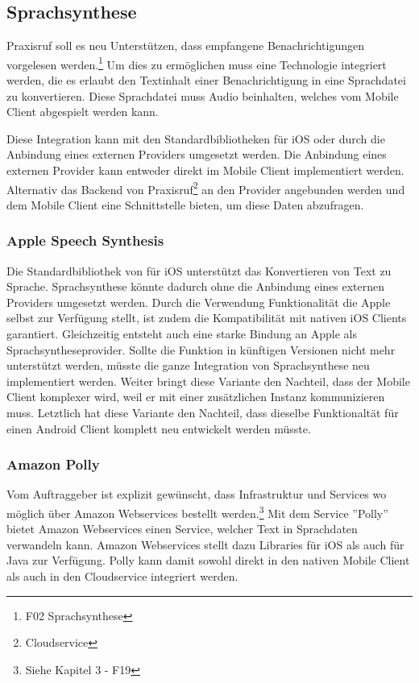 \subsection{Sprachsynthese}

Praxisruf soll es neu Unterstützen, dass empfangene Benachrichtigungen vorgelesen werden.\footnote{F02 Sprachsynthese}
Um dies zu ermöglichen muss eine Technologie integriert werden, die es erlaubt den Textinhalt einer Benachrichtigung in eine Sprachdatei zu konvertieren.
Diese Sprachdatei muss Audio beinhalten, welches vom Mobile Client abgespielt werden kann.

Diese Integration kann mit den Standardbibliotheken für iOS oder durch die Anbindung eines externen Providers umgesetzt werden.
Die Anbindung eines externen Provider kann entweder direkt im Mobile Client implementiert werden.
Alternativ das Backend von Praxisruf\footnote{Cloudservice} an den Provider angebunden werden und dem Mobile Client eine Schnittstelle bieten, um diese Daten abzufragen.

\subsubsection{Apple Speech Synthesis}

Die Standardbibliothek von für iOS unterstützt das Konvertieren von Text zu Sprache.\cite{ios_speech_synthesis}
Sprachsynthese könnte dadurch ohne die Anbindung eines externen Providers umgesetzt werden.
Durch die Verwendung Funktionalität die Apple selbst zur Verfügung stellt, ist zudem die Kompatibilität mit nativen iOS Clients garantiert.
Gleichzeitig entsteht auch eine starke Bindung an Apple als Sprachsyntheseprovider.
Sollte die Funktion in künftigen Versionen nicht mehr unterstützt werden, müsste die ganze Integration von Sprachsynthese neu implementiert werden.
Weiter bringt diese Variante den Nachteil, dass der Mobile Client komplexer wird, weil er mit einer zusätzlichen Instanz kommunizieren muss.
Letztlich hat diese Variante den Nachteil, dass dieselbe Funktionaltät für einen Android Client komplett neu entwickelt werden müsste.

\subsubsection{Amazon Polly}

Vom Auftraggeber ist explizit gewünscht, dass Infrastruktur und Services wo möglich über Amazon Webservices bestellt werden.\footnote{Siehe Kapitel 3 - F19}
Mit dem Service ''Polly'' bietet Amazon Webservices einen Service, welcher Text in Sprachdaten verwandeln kann.\cite{aws_polly}
Amazon Webservices stellt dazu Libraries für iOS\cite{aws_polly_ios} als auch für Java zur Verfügung\cite{aws_polly_java}.
Polly kann damit sowohl direkt in den nativen Mobile Client als auch in den Cloudservice integriert werden.

